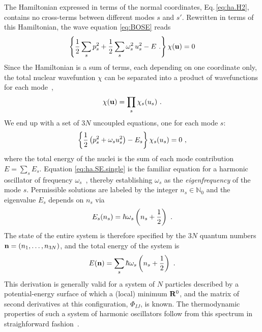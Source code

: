 The Hamiltonian expressed in terms of the normal coordinates, Eq.\,\eqref{eq:ha.H2}, contains no cross-terms between different modes $s$ and $s'$. Rewritten in terms of this Hamiltonian, the wave equation \eqref{eq:BOSE} reads
\begin{align}
	\left\{
		\halb \sum_s p_s^2 + \halb \sum_{s} \omega_s^2	\, u_s^2 - E~.
	\right\} \chi ({\bf u})
	= 0
	\label{eq:ha.SE.2}
\end{align}
Since the Hamiltonian is a sum of terms, each depending on one coordinate only, the total nuclear wavefuntion $\chi$ can be separated into a product of wavefunctions for each mode~\cite[p.\,175]{BornHuang},
\begin{align}
	\chi({\bf u}) = \prod_{s} \chi_s (u_s)~.
	\label{eq:ha.chi}
\end{align}
We end up with a set of $3N$ uncoupled equations, one for each mode $s$:
\begin{align}
	\left\{	\halb \left( p_s^2 + \omega_s u_s^2 \right)	- E_s	\right\} \chi_s (u_s)
		= 0~,
	\label{eq:ha.SE.single}
\end{align}
where the total energy of the nuclei is the sum of each mode contribution $E = \sum_s E_s$. Equation \eqref{eq:ha.SE.single} is the familiar equation for a harmonic oscillator of frequency $\omega_s$~\cite{Dirac1981}, thereby establishing $\omega_s$ as the \emph{eigenfrequency} of the mode $s$. Permissible solutions are labeled by the integer $n_s \in \mathds N_0$ and the eigenvalue $E_s$ depends on $n_s$ via
\begin{align}
	E_s(n_s) = \hbar \omega_s \left( n_s + \halb \right)~.
	\label{eq:E_s}
\end{align}
The state of the entire system is therefore specified by the $3N$ quantum numbers ${\bf n} = (n_1, \ldots, n_{3N})$, and the total energy of the system is
\begin{align}
	E ({\bf n}) = \sum_s \hbar \omega_s \left( n_s + \frac{1}{2} \right)~.
\end{align}
This derivation is generally valid for a system of $N$ particles described by a potential-energy surface of which a (local) minimum ${\bf R}^0$, and the matrix of second derivatives at this configuration, $\Phi_{IJ}$, is known. The thermodynamic properties of such a system of harmonic oscillators follow from this spectrum in straighforward fashion~\cite{BornHuang}.



